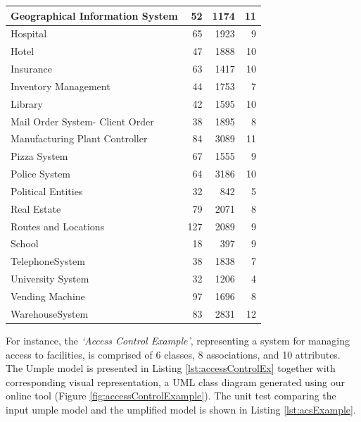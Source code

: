 \begin{table}
\begin{tabular}{p{6cm}|rrr}
Geographical Information System & 52 & 1174 & 11\\ \hline
Hospital & 65 & 1923 & 9\\ \hline
Hotel & 47 & 1888 & 10\\ \hline
Insurance & 63 & 1417 & 10\\ \hline
Inventory Management & 44 & 1753 & 7\\ \hline
Library & 42 & 1595 & 10\\ \hline
Mail Order System- Client Order & 38 & 1895 & 8\\ \hline
Manufacturing Plant Controller & 84 & 3089 & 11\\ \hline
Pizza System & 67 & 1555 & 9 \\ \hline
Police System & 64 & 3186 & 10\\ \hline
Political Entities & 32 & 842 & 5\\ \hline
Real Estate & 79 & 2071 & 8\\ \hline
Routes and Locations & 127 & 2089 & 9\\ \hline
School & 18 & 397 & 9\\ \hline
TelephoneSystem & 38 & 1838 & 7\\ \hline
University System & 32 & 1206 & 4\\ \hline
Vending Machine & 97 & 1696 & 8\\ \hline
WarehouseSystem & 83 & 2831 & 12\\ \hline
\bottomrule
\end{tabular}
\end{table}

For instance, the \textit{`Access Control Example'}, representing a system for managing access to facilities, is comprised of 6 classes, 8 associations, and 10 attributes. The Umple model is presented in Listing \ref{lst:accessControlEx} together with corresponding visual representation, a UML class diagram generated using our online tool (Figure \ref{fig:accessControlExample}). The unit test comparing the input umple model and the umplified model is shown in Listing \ref{lst:acsExample}.

